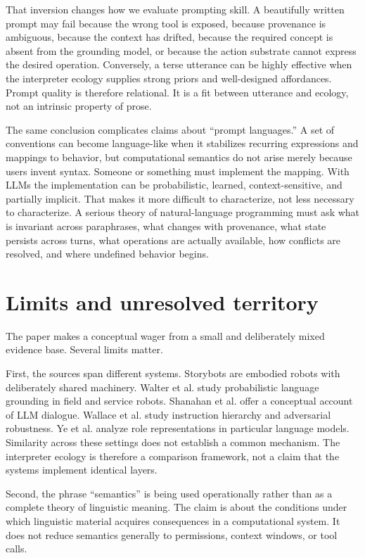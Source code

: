 \documentclass[11pt]{article}
\begin{document}
That inversion changes how we evaluate prompting skill. A beautifully written prompt may fail because the wrong tool is exposed, because provenance is ambiguous, because the context has drifted, because the required concept is absent from the grounding model, or because the action substrate cannot express the desired operation. Conversely, a terse utterance can be highly effective when the interpreter ecology supplies strong priors and well-designed affordances. Prompt quality is therefore relational. It is a fit between utterance and ecology, not an intrinsic property of prose.

The same conclusion complicates claims about ``prompt languages.'' A set of conventions can become language-like when it stabilizes recurring expressions and mappings to behavior, but computational semantics do not arise merely because users invent syntax. Someone or something must implement the mapping. With LLMs the implementation can be probabilistic, learned, context-sensitive, and partially implicit. That makes it more difficult to characterize, not less necessary to characterize. A serious theory of natural-language programming must ask what is invariant across paraphrases, what changes with provenance, what state persists across turns, what operations are actually available, how conflicts are resolved, and where undefined behavior begins.

\section{Limits and unresolved territory}

The paper makes a conceptual wager from a small and deliberately mixed evidence base. Several limits matter.

First, the sources span different systems. Storybots are embodied robots with deliberately shared machinery. Walter et al. study probabilistic language grounding in field and service robots. Shanahan et al. offer a conceptual account of LLM dialogue. Wallace et al. study instruction hierarchy and adversarial robustness. Ye et al. analyze role representations in particular language models. Similarity across these settings does not establish a common mechanism. The interpreter ecology is therefore a comparison framework, not a claim that the systems implement identical layers.

Second, the phrase ``semantics'' is being used operationally rather than as a complete theory of linguistic meaning. The claim is about the conditions under which linguistic material acquires consequences in a computational system. It does not reduce semantics generally to permissions, context windows, or tool calls.
\end{document}
